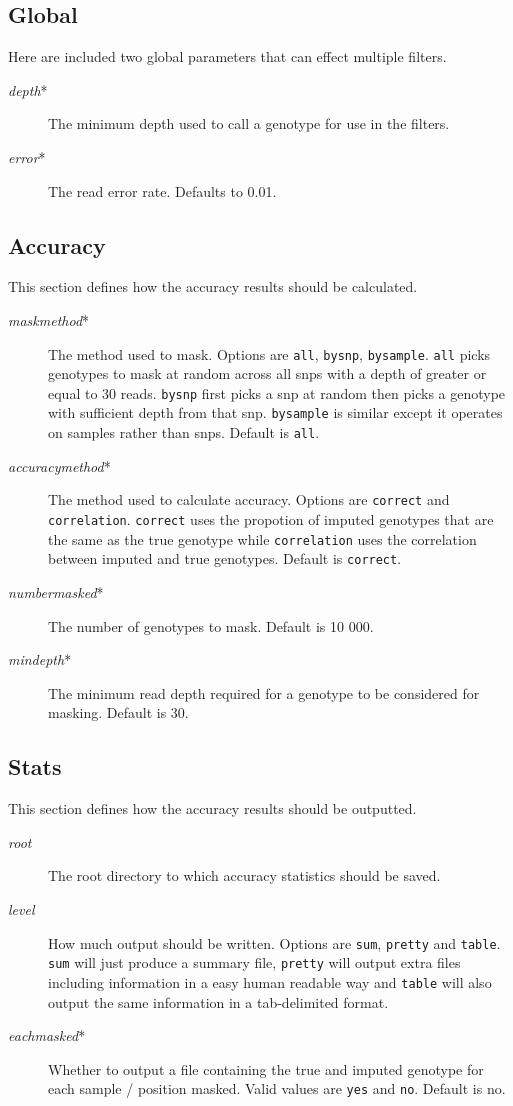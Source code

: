 \documentclass[10pt]{report}
\begin{document}
\subsection{Global}
Here are included two global parameters that can effect multiple filters.
\begin{description}
\item[\emph{depth}*] The minimum depth used to call a genotype for use in the filters.
\item[\emph{error}*] The read error rate.  Defaults to 0.01.
\end{description}

\subsection{Accuracy}
This section defines how the accuracy results should be calculated.
\begin{description}
\item[\emph{maskmethod}*] The method used to mask.  Options are \texttt{all}, \texttt{bysnp}, \texttt{bysample}.  \texttt{all} picks genotypes to mask at random across all snps with a depth of greater or equal to 30 reads.  \texttt{bysnp} first picks a snp at random then picks a genotype with sufficient depth from that snp.  \texttt{bysample} is similar except it operates on samples rather than snps.  Default is \texttt{all}.
\item[\emph{accuracymethod}*] The method used to calculate accuracy.  Options are \texttt{correct} and \texttt{correlation}.  \texttt{correct} uses the propotion of imputed genotypes that are the same as the true genotype while \texttt{correlation} uses the correlation between imputed and true genotypes.  Default is \texttt{correct}.
\item[\emph{numbermasked}*] The number of genotypes to mask.  Default is 10 000.
\item[\emph{mindepth}*] The minimum read depth required for a genotype to be considered for masking.  Default is 30.
\end{description}

\subsection{Stats}
This section defines how the accuracy results should be outputted.
\begin{description}
\item[\emph{root}] The root directory to which accuracy statistics should be saved.
\item[\emph{level}] How much output should be written.  Options are \texttt{sum}, \texttt{pretty} and \texttt{table}.  \texttt{sum} will just produce a summary file, \texttt{pretty} will output extra files including information in a easy human readable way and \texttt{table} will also output the same information in a tab-delimited format.
\item[\emph{eachmasked}*] Whether to output a file containing the true and imputed genotype for each sample / position masked.  Valid values are \texttt{yes} and \texttt{no}.  Default is no.
\end{description}
\end{document}
